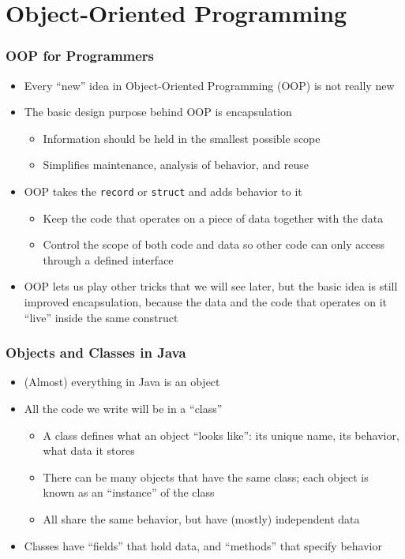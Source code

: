 \documentclass{beamer}
\begin{document}
\section{Object-Oriented Programming}
\begin{frame}
\frametitle{OOP for Programmers}
\begin{itemize}
\item Every ``new'' idea in Object-Oriented Programming (OOP) is not really new
\item The basic design purpose behind OOP is encapsulation
\begin{itemize}
\item Information should be held in the smallest possible scope
\item Simplifies maintenance, analysis of behavior, and reuse
\end{itemize}
\item OOP takes the \texttt{record} or \texttt{struct} and adds behavior to it
\begin{itemize}
\item Keep the code that operates on a piece of data together with the data
\item Control the scope of both code and data so other code can only access through a defined interface
\end{itemize}
\item OOP lets us play other tricks that we will see later, but the basic idea is still improved encapsulation, because the data and the code that operates on it ``live'' inside the same construct
\end{itemize}
\end{frame}

\begin{frame}
\frametitle{Objects and Classes in Java}
\begin{itemize}
\item (Almost) everything in Java is an object
\item All the code we write will be in a ``class''
\begin{itemize}
\item A class defines what an object ``looks like'': its unique name, its behavior, what data it stores
\item There can be many objects that have the same class; each object is known as an ``instance'' of the class
\item All share the same behavior, but have (mostly) independent data
\end{itemize}
\item Classes have ``fields'' that hold data, and ``methods'' that specify behavior
\end{itemize}
\end{frame}
\end{document}
